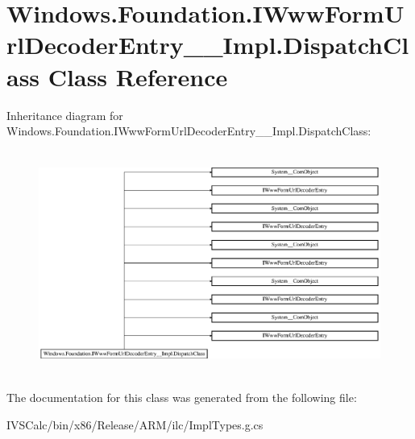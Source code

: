 \hypertarget{class_windows_1_1_foundation_1_1_i_www_form_url_decoder_entry_____impl_1_1_dispatch_class}{}\section{Windows.\+Foundation.\+I\+Www\+Form\+Url\+Decoder\+Entry\+\_\+\+\_\+\+Impl.\+Dispatch\+Class Class Reference}
\label{class_windows_1_1_foundation_1_1_i_www_form_url_decoder_entry_____impl_1_1_dispatch_class}
Inheritance diagram for Windows.\+Foundation.\+I\+Www\+Form\+Url\+Decoder\+Entry\+\_\+\+\_\+\+Impl.\+Dispatch\+Class\+:\begin{figure}[H]
\begin{center}
\leavevmode
\includegraphics[height=7.386091cm]{class_windows_1_1_foundation_1_1_i_www_form_url_decoder_entry_____impl_1_1_dispatch_class}
\end{center}
\end{figure}


The documentation for this class was generated from the following file\+:\begin{DoxyCompactItemize}
\item 
I\+V\+S\+Calc/bin/x86/\+Release/\+A\+R\+M/ilc/Impl\+Types.\+g.\+cs\end{DoxyCompactItemize}
